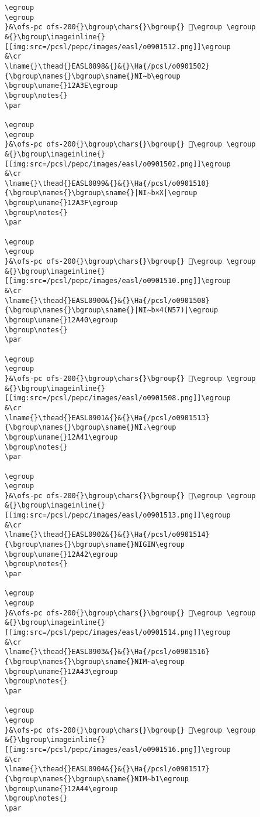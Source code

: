 \begin{verbatim}
\egroup
\egroup
}&\ofs-pc ofs-200{}\bgroup\chars{}\bgroup{} 𒨽\egroup \egroup
&{}\bgroup\imageinline{}[[img:src=/pcsl/pepc/images/easl/o0901512.png]]\egroup
&\cr
\lname{}\thead{}EASL0898&{}&{}\Ha{/pcsl/o0901502}{\bgroup\names{}\bgroup\sname{}NI∼b\egroup
\bgroup\uname{}12A3E\egroup
\bgroup\notes{}
\par 

\egroup
\egroup
}&\ofs-pc ofs-200{}\bgroup\chars{}\bgroup{} 𒨾\egroup \egroup
&{}\bgroup\imageinline{}[[img:src=/pcsl/pepc/images/easl/o0901502.png]]\egroup
&\cr
\lname{}\thead{}EASL0899&{}&{}\Ha{/pcsl/o0901510}{\bgroup\names{}\bgroup\sname{}|NI∼b×X|\egroup
\bgroup\uname{}12A3F\egroup
\bgroup\notes{}
\par 

\egroup
\egroup
}&\ofs-pc ofs-200{}\bgroup\chars{}\bgroup{} 𒨿\egroup \egroup
&{}\bgroup\imageinline{}[[img:src=/pcsl/pepc/images/easl/o0901510.png]]\egroup
&\cr
\lname{}\thead{}EASL0900&{}&{}\Ha{/pcsl/o0901508}{\bgroup\names{}\bgroup\sname{}|NI∼b×4(N57)|\egroup
\bgroup\uname{}12A40\egroup
\bgroup\notes{}
\par 

\egroup
\egroup
}&\ofs-pc ofs-200{}\bgroup\chars{}\bgroup{} 𒩀\egroup \egroup
&{}\bgroup\imageinline{}[[img:src=/pcsl/pepc/images/easl/o0901508.png]]\egroup
&\cr
\lname{}\thead{}EASL0901&{}&{}\Ha{/pcsl/o0901513}{\bgroup\names{}\bgroup\sname{}NI₂\egroup
\bgroup\uname{}12A41\egroup
\bgroup\notes{}
\par 

\egroup
\egroup
}&\ofs-pc ofs-200{}\bgroup\chars{}\bgroup{} 𒩁\egroup \egroup
&{}\bgroup\imageinline{}[[img:src=/pcsl/pepc/images/easl/o0901513.png]]\egroup
&\cr
\lname{}\thead{}EASL0902&{}&{}\Ha{/pcsl/o0901514}{\bgroup\names{}\bgroup\sname{}NIGIN\egroup
\bgroup\uname{}12A42\egroup
\bgroup\notes{}
\par 

\egroup
\egroup
}&\ofs-pc ofs-200{}\bgroup\chars{}\bgroup{} 𒩂\egroup \egroup
&{}\bgroup\imageinline{}[[img:src=/pcsl/pepc/images/easl/o0901514.png]]\egroup
&\cr
\lname{}\thead{}EASL0903&{}&{}\Ha{/pcsl/o0901516}{\bgroup\names{}\bgroup\sname{}NIM∼a\egroup
\bgroup\uname{}12A43\egroup
\bgroup\notes{}
\par 

\egroup
\egroup
}&\ofs-pc ofs-200{}\bgroup\chars{}\bgroup{} 𒩃\egroup \egroup
&{}\bgroup\imageinline{}[[img:src=/pcsl/pepc/images/easl/o0901516.png]]\egroup
&\cr
\lname{}\thead{}EASL0904&{}&{}\Ha{/pcsl/o0901517}{\bgroup\names{}\bgroup\sname{}NIM∼b1\egroup
\bgroup\uname{}12A44\egroup
\bgroup\notes{}
\par 


\end{verbatim}
